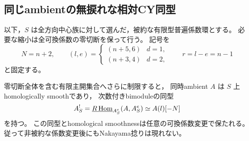 \subsection{同じambientの無捩れな相対CY同型}

以下，$S$ は全方向中心族に対して選んだ，被約な有限型普遍係数環とする。
必要な縮小は全可換係数の零切断を保って行う。
記号を
\[
 N=n+2,\qquad
 (l,e)=\begin{cases}(n+5,6)&d=1,\\(n+3,4)&d=2,\end{cases}
 \qquad r=l-e=n-1
\]
と固定する。

\begin{theorem}\label{thm:simultaneous-relative-cy}
零切断全体を含む有限主開集合へさらに制限すると，
同時ambient $A$ は $S$ 上homologically smoothであり，
次数付きbimoduleの同型
\begin{equation}\label{eq:simultaneous-relative-cy}
 A^!_S=\underline{R\operatorname{Hom}}_{A^e_S}(A,A^e_S)
          \simeq A(l)[-N]
\end{equation}
を持つ。
この同型とhomological smoothnessは任意の可換係数変更で保たれる。
従って非被約な係数変更後にもNakayama捻りは現れない。
\end{theorem}
